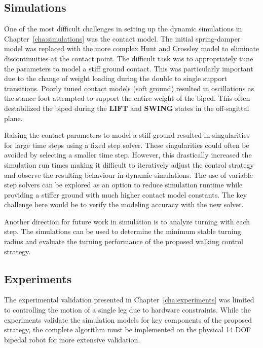 \subsection{Simulations} %
\label{sub:simulations}
One of the most difficult challenges in setting up the dynamic simulations in Chapter~\ref{cha:simulations} was the contact model. The initial spring-damper model was replaced with the more complex Hunt and Crossley model to eliminate discontinuities at the contact point. The difficult task was to appropriately tune the parameters to model a stiff ground contact. This was particularly important due to the change of weight loading during the double to single support transitions. Poorly tuned contact models (soft ground) resulted in oscillations as the stance foot attempted to support the entire weight of the biped. This often destabilized the biped during the \textbf{LIFT} and \textbf{SWING} states in the off-sagittal plane. 

Raising the contact parameters to model a stiff ground resulted in singularities for large time steps using a fixed step solver. These singularities could often be avoided by selecting a smaller time step. However, this drastically increased the simulation run times making it difficult to iteratively adjust the control strategy and observe the resulting behaviour in dynamic simulations. The use of variable step solvers can be explored as an option to reduce simulation runtime while providing a stiffer ground with much higher contact model constants. The key challenge here would be to verify the modeling accuracy with the new solver. 

Another direction for future work in simulation is to analyze turning with each step. The simulations can be used to determine the minimum stable turning radius and evaluate the turning performance of the proposed walking control strategy. 

\subsection{Experiments} %
\label{sub:experiments}
The experimental validation presented in Chapter~\ref{cha:experiments} was limited to controlling the motion of a single leg due to hardware constraints. While the experiments validate the simulation models for key components of the proposed strategy, the complete algorithm must be implemented on the physical 14 DOF bipedal robot for more extensive validation. 

